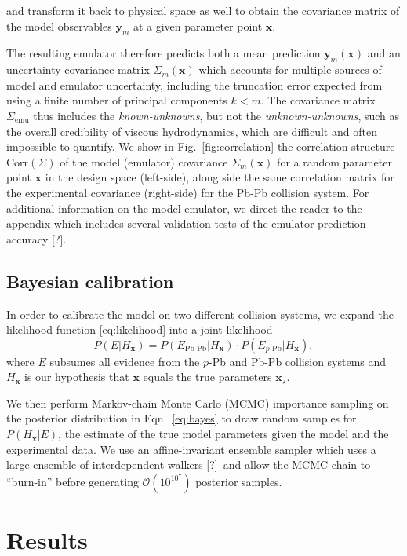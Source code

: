 \documentclass[aps,prc,reprint,amsmath,nofootinbib]{revtex4-1}
\newcommand{\x}{\mathbf{x}}
\newcommand{\y}{\mathbf{y}}
\newcommand{\order}[1]{$\mathcal O(10^{#1})$}
\newcommand{\note}{\textcolor{theblue}{[?]}}
\begin{document}
and transform it back to physical space as well to obtain the covariance matrix of the model observables $\y_m$ at a given parameter point $\x$.

The resulting emulator therefore predicts both a mean prediction $\y_m(\x)$ and an uncertainty covariance matrix $\Sigma_m(\x)$ which accounts for multiple sources of model and emulator uncertainty, including the truncation error expected from using a finite number of principal components $k < m$.
The covariance matrix $\Sigma_\text{emu}$ thus includes the \emph{known-unknowns}, but not the \emph{unknown-unknowns}, such as the overall credibility of viscous hydrodynamics, which are difficult and often impossible to quantify.
We show in Fig.~\ref{fig:correlation} the correlation structure $\text{Corr}(\Sigma)$ of the model (emulator) covariance $\Sigma_m(\x)$ for a random parameter point $\x$ in the design space (left-side), along side the same correlation matrix for the experimental covariance (right-side) for the Pb-Pb collision system.
For additional information on the model emulator, we direct the reader to the appendix which includes several validation tests of the emulator prediction accuracy \note.

\subsection{Bayesian calibration}

In order to calibrate the model on two different collision systems, we expand the likelihood function \eqref{eq:likelihood} into a joint likelihood
\begin{equation}
  \label{eq:joint_likelihood}
  P(E | H_\x) = P(E_\text{Pb-Pb} | H_\x) \cdot P(E_\text{$p$-Pb} | H_\x),
\end{equation}
where $E$ subsumes all evidence from the $p$-Pb and Pb-Pb collision systems and $H_\x$ is our hypothesis that $\x$ equals the true parameters $\x_\star$.

We then perform Markov-chain Monte Carlo (MCMC) importance sampling on the posterior distribution in Eqn.~\eqref{eq:bayes} to draw random samples for $P(H_\x | E)$, the estimate of the true model parameters given the model and the experimental data.
We use an affine-invariant ensemble sampler which uses a large ensemble of interdependent walkers \note\ and allow the MCMC chain to ``burn-in'' before generating \order{10^7} posterior samples.


\section{Results}
\label{sec:results}
\end{document}
